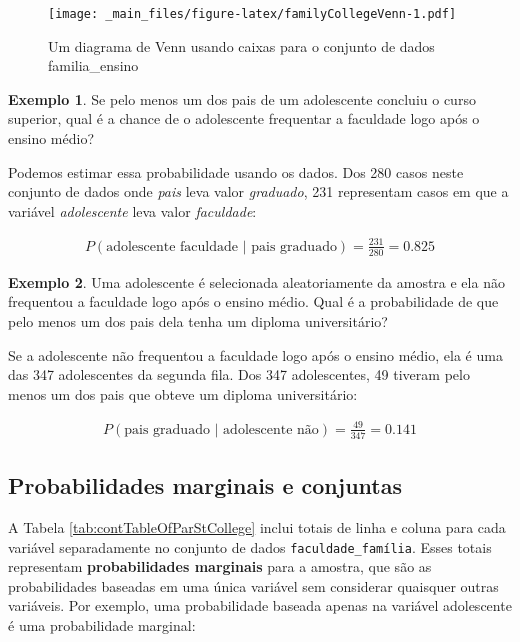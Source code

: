 \documentclass[
]{book}
\theoremstyle{definition}
\theoremstyle{definition}
\newtheorem{example}{Exemplo}[chapter]
\theoremstyle{definition}
\theoremstyle{definition}
\theoremstyle{remark}
\begin{document}
\begin{figure}
\centering
\texttt{[image: \_main\_files/figure-latex/familyCollegeVenn-1.pdf]}
\caption{\label{fig:familyCollegeVenn}Um diagrama de Venn usando caixas para o conjunto de dados familia\_ensino}
\end{figure}

\begin{example}
\protect\hypertarget{exm:unnamed-chunk-57}{}{\label{exm:unnamed-chunk-57} }Se pelo menos um dos pais de um adolescente concluiu o curso superior, qual é a chance de o adolescente frequentar a faculdade logo após o ensino médio?
\end{example}

Podemos estimar essa probabilidade usando os dados. Dos 280 casos neste conjunto de dados onde \emph{pais} leva valor \emph{graduado}, 231 representam casos em que a variável \emph{adolescente} leva valor \emph{faculdade}:

\begin{eqnarray*}
P(\text{adolescente faculdade | pais graduado}) = \frac{231}{280} = 0.825
\end{eqnarray*}

\begin{example}
\protect\hypertarget{exm:collegeProbOfParentsGivenStudentNot}{}{\label{exm:collegeProbOfParentsGivenStudentNot} }Uma adolescente é selecionada aleatoriamente da amostra e ela não frequentou a faculdade logo após o ensino médio. Qual é a probabilidade de que pelo menos um dos pais dela tenha um diploma universitário?
\end{example}

Se a adolescente não frequentou a faculdade logo após o ensino médio, ela é uma das 347 adolescentes da segunda fila. Dos 347 adolescentes, 49 tiveram pelo menos um dos pais que obteve um diploma universitário:

\begin{eqnarray*}
P(\text{pais graduado | adolescente não}) = \frac{49}{347} = 0.141
\end{eqnarray*}

\hypertarget{marginalAndJointProbabilities}{%
\subsection{Probabilidades marginais e conjuntas}\label{marginalAndJointProbabilities}}

A Tabela \ref{tab:contTableOfParStCollege} inclui totais de linha e coluna para cada variável separadamente no conjunto de dados \texttt{faculdade\_família}. Esses totais representam \textbf{probabilidades marginais} para a amostra, que são as probabilidades baseadas em uma única variável sem considerar quaisquer outras variáveis. Por exemplo, uma probabilidade baseada apenas na variável adolescente é uma probabilidade marginal:
\end{document}
